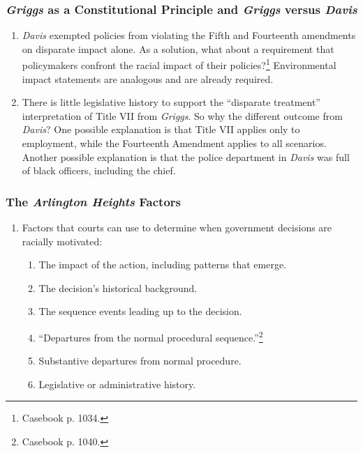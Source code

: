 \subsubsection{\emph{Griggs} as a Constitutional Principle and \emph{Griggs} 
versus \emph{Davis}}

\begin{enumerate}
    \item \emph{Davis} exempted policies from violating the Fifth and 
    Fourteenth amendments on disparate impact alone. As a solution, what about 
    a requirement that policymakers confront the racial impact of their 
    policies?\footnote{Casebook p. 1034.} Environmental impact statements are 
    analogous and are already required.
    \item There is little legislative history to support the ``disparate 
    treatment'' interpretation of Title VII from \emph{Griggs}. So why the 
    different outcome from \emph{Davis}? One possible explanation is that 
    Title VII applies only to employment, while the Fourteenth Amendment 
    applies to all scenarios. Another possible explanation is that the police 
    department in \emph{Davis} was full of black officers, including the 
    chief.
\end{enumerate}

\subsubsection{The \emph{Arlington Heights} Factors}

\begin{enumerate}
    \item Factors that courts can use to determine when government decisions 
    are racially motivated:
    \begin{enumerate}
        \item The impact of the action, including patterns that emerge.
        \item The decision's historical background.
        \item The sequence events leading up to the decision.
        \item ``Departures from the normal procedural 
        sequence.''\footnote{Casebook p. 1040.}
        \item Substantive departures from normal procedure.
        \item Legislative or administrative history.
    \end{enumerate}
\end{enumerate}
 
